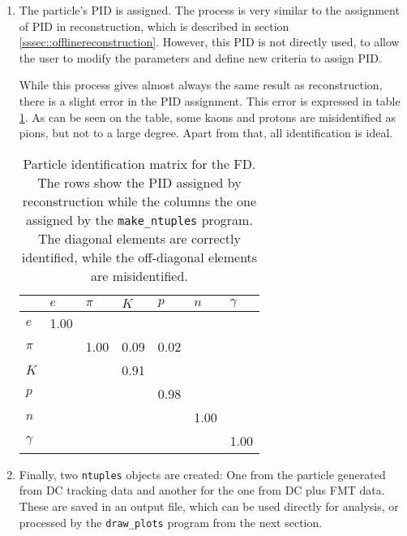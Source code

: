 \begin{enumerate}
        \item
            The particle's PID is assigned.
            The process is very similar to the assignment of PID in reconstruction, which is described in section \ref{sssec::offlinereconstruction}.
            However, this PID is not directly used, to allow the user to modify the parameters and define new criteria to assign PID.

            While this process gives almost always the same result as reconstruction, there is a slight error in the PID assignment.
            This error is expressed in table \ref{tab::mpid}.
            As can be seen on the table, some kaons and protons are misidentified as pions, but not to a large degree.
            Apart from that, all identification is ideal.

            \begin{table}
                \caption{Particle identification matrix for the FD.
                The rows show the PID assigned by reconstruction while the columns the one assigned by the \texttt{make\_ntuples} program.
                The diagonal elements are correctly identified, while the off-diagonal elements are misidentified.}

                \begin{center}
                    \begin{tabularx}{240pt}{X|llllll}
                        \cline{2-7}
                                 & $e$      & $\pi$ & $K$  & $p$  & $n$  & $\gamma$ \\
                        \hline
                        $e$      & 1.00     &       &      &      &      &          \\
                        $\pi$    &          & 1.00  & 0.09 & 0.02 &      &          \\
                        $K$      &          &       & 0.91 &      &      &          \\
                        $p$      &          &       &      & 0.98 &      &          \\
                        $n$      &          &       &      &      & 1.00 &          \\
                        $\gamma$ &          &       &      &      &      & 1.00     \\
                        \hline
                    \end{tabularx}
                \end{center}
                \label{tab::mpid}
            \end{table}

        \item
            Finally, two \texttt{ntuples} objects are created: One from the particle generated from DC tracking data and another for the one from DC plus FMT data.
            These are saved in an output file, which can be used directly for analysis, or processed by the \texttt{draw\_plots} program from the next section.
    \end{enumerate}

